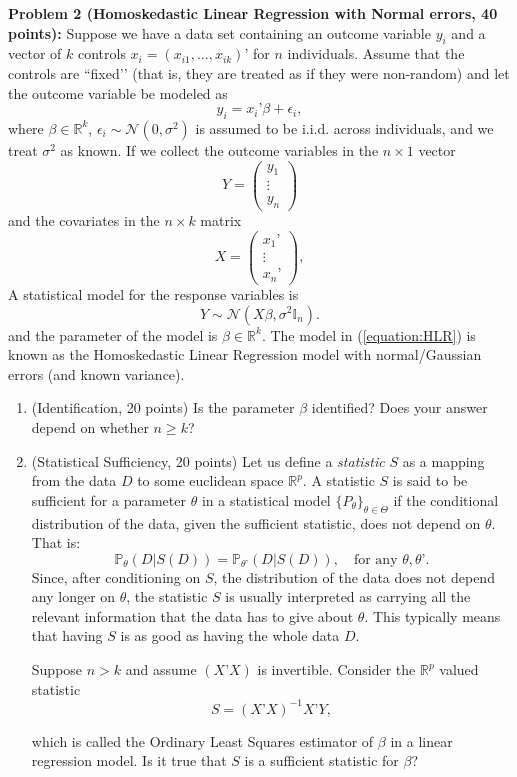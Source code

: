 \documentclass[11pt]{article} %
\begin{document}
\noindent \textbf{Problem 2 (Homoskedastic Linear Regression with Normal errors, 40 points):} Suppose we have a data set containing an outcome variable $y_i$ and a vector of $k$ controls $x_i = (x_{i1},\ldots, x_{ik})’$ for $n$ individuals. Assume that the controls are ``fixed’’ (that is, they are treated as if they were non-random) and let the outcome variable be modeled as
\[ y_i = x_i’ \beta + \epsilon_{i}, \]
where $\beta \in \mathbb{R}^{k}$, $\epsilon_{i} \sim \mathcal{N}(0, \sigma^2)$ is assumed to be i.i.d. across individuals, and we treat $\sigma^2$ as known.  If we collect the outcome variables in the $n \times 1$ vector
\[ 
Y = 
\begin{pmatrix}
y_{1} \\
\vdots \\
y_{n}
\end{pmatrix} 
\]
and the covariates in the $n \times k$ matrix
\[ X =
\begin{pmatrix}
x_1’ \\
\vdots\\
x_n’
\end{pmatrix},
\]
A statistical model for the response variables is
\begin{equation} \label{equation:HLR}
Y \sim \mathcal{N}(X \beta, \sigma^2 \mathbb{I}_n ). 
\end{equation}
and the parameter of the model is $\beta \in \mathbb{R}^{k}$. The model in (\ref{equation:HLR}) is known as the Homoskedastic Linear Regression model with normal/Gaussian errors (and known variance). 

\begin{enumerate}
\item (Identification, 20 points) Is the parameter $\beta$ identified? Does your answer depend on whether $n \geq k$?  

\item (Statistical Sufficiency, 20 points) Let us define a \emph{statistic} $S$ as a mapping from the data $D$ to some euclidean space $\mathbb{R}^{p}$. A statistic $S$ is said to be sufficient for a parameter $\theta$  in a statistical model $\{P_{\theta}\}_{\theta \in \Theta}$ if the conditional distribution of the data, given the sufficient statistic, does not depend on $\theta$. That is:
\[ \mathbb{P}_{\theta} (D | S(D)) = \mathbb{P}_{\theta’}(D| S(D)), \quad \textrm{for any } \theta, \theta’. \]
Since, after conditioning on $S$, the distribution of the data does not depend any longer on $\theta$, the statistic $S$ is usually interpreted as carrying all the relevant information that the data has to give about $\theta$. This typically means that having $S$ is as good as having the whole data $D$. 

Suppose $n > k$ and assume $(X’X)$ is invertible. Consider the $\mathbb{R}^{p}$ valued statistic 
\[ S = (X’X)^{-1} X’ Y, \]

which is called the Ordinary Least Squares estimator of $\beta$ in a linear regression model. Is it true that $S$ is a sufficient statistic for $\beta$?

\end{enumerate}
\end{document}
